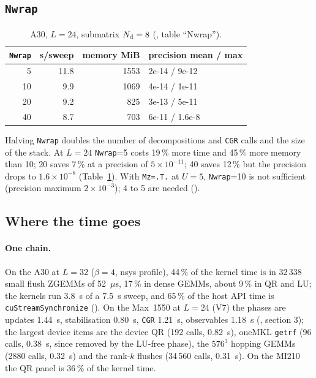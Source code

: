 \subsection{\texttt{Nwrap}}

\begin{table}[h]
\centering\small
\caption{A30, $L=24$, submatrix $N_{\rm d}=8$ (, table ``Nwrap'').}
\label{tab:nwrap}
\begin{tabular}{@{}rrrl@{}}
\toprule
\texttt{Nwrap} & s/sweep & memory MiB & precision mean / max \\
\midrule
5 & 11.8 & 1553 & 2e-14 / 9e-12 \\ %
10 & 9.9 & 1069 & 4e-14 / 1e-11 \\
20 & 9.2 & 825 & 3e-13 / 5e-11 \\
40 & 8.7 & 703 & 6e-11 / 1.6e-8 \\
\bottomrule
\end{tabular}
\end{table}

Halving \texttt{Nwrap} doubles the number of decompositions and \texttt{CGR} calls and the size of the stack. At $L=24$ \texttt{Nwrap}=5 costs 19\,\% more time and 45\,\% more memory than 10; 20 saves 7\,\% at a precision of $5\times10^{-11}$; 40 saves 12\,\% but the precision drops to $1.6\times10^{-8}$ (Table~\ref{tab:nwrap}). With \texttt{Mz=.T.} at $U=5$, \texttt{Nwrap}=10 is not sufficient (precision maximum $2\times10^{-3}$); 4 to 5 are needed (). %

\subsection{Where the time goes}

\paragraph{One chain.} On the A30 at $L=32$ ($\beta=4$, nsys profile), 44\,\% of the kernel time is in 32\,338 small flush ZGEMMs of 52~$\mu$s, 17\,\% in dense GEMMs, about 9\,\% in QR and LU; the kernels run 3.8~s of a 7.5~s sweep, and 65\,\% of the host API time is \texttt{cuStreamSynchronize} (). On the Max~1550 at $L=24$ (V7) the phases are updates 1.44~s, stabilisation 0.80~s, \texttt{CGR} 1.21~s, observables 1.18~s (, section 3); %
the largest device items are the device QR (192 calls, 0.82~s), oneMKL \texttt{getrf} (96 calls, 0.38~s, since removed by the LU-free phase), the $576^3$ hopping GEMMs (2880 calls, 0.32~s) and the rank-$k$ flushes (34\,560 calls, 0.31~s). On the MI210 the QR panel is 36\,\% of the kernel time.

